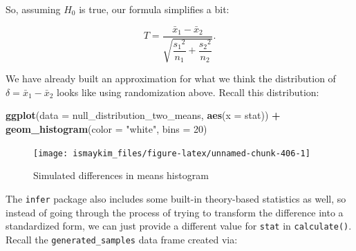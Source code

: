 \documentclass[12pt,]{krantz}
\makeatletter
\newenvironment{Shaded}{\begin{snugshade}}{\end{snugshade}}
\newcommand{\KeywordTok}[1]{\textcolor[rgb]{0.27,0.27,0.27}{\textbf{#1}}}
\newcommand{\DataTypeTok}[1]{\textcolor[rgb]{0.27,0.27,0.27}{#1}}
\newcommand{\DecValTok}[1]{\textcolor[rgb]{0.06,0.06,0.06}{#1}}
\newcommand{\StringTok}[1]{\textcolor[rgb]{0.5,0.5,0.5}{#1}}
\newcommand{\OperatorTok}[1]{\textcolor[rgb]{0.43,0.43,0.43}{\textbf{#1}}}
\newcommand{\NormalTok}[1]{#1}
\newenvironment{kframe}{%
\medskip{}
\setlength{\fboxsep}{.8em}
 \def\at@end@of@kframe{}%
 \ifinner\ifhmode%
  \def\at@end@of@kframe{\end{minipage}}%
  \begin{minipage}{\columnwidth}%
 \fi\fi%
 \def\FrameCommand##1{\hskip\@totalleftmargin \hskip-\fboxsep
 \colorbox{shadecolor}{##1}\hskip-\fboxsep
     \hskip-\linewidth \hskip-\@totalleftmargin \hskip\columnwidth}%
 \MakeFramed {\advance\hsize-\width
   \@totalleftmargin\z@ \linewidth\hsize
   \@setminipage}}%
 {\par\unskip\endMakeFramed%
 \at@end@of@kframe}
\renewenvironment{Shaded}{\begin{kframe}}{\end{kframe}}
\theoremstyle{definition}
\theoremstyle{definition}
\theoremstyle{definition}
\theoremstyle{remark}
\makeatother
\begin{document}
So, assuming \(H_0\) is true, our formula simplifies a bit:

\[T =\dfrac{ \bar{x}_1 - \bar{x}_2}{ \sqrt{\dfrac{{s_1}^2}{n_1} + \dfrac{{s_2}^2}{n_2}}  }.\]

We have already built an approximation for what we think the
distribution of \(\delta = \bar{x}_1 - \bar{x}_2\) looks like using
randomization above. Recall this distribution:

\begin{Shaded}
\begin{Highlighting}[]
\KeywordTok{ggplot}\NormalTok{(}\DataTypeTok{data =}\NormalTok{ null_distribution_two_means, }\KeywordTok{aes}\NormalTok{(}\DataTypeTok{x =}\NormalTok{ stat)) }\OperatorTok{+}
\StringTok{  }\KeywordTok{geom_histogram}\NormalTok{(}\DataTypeTok{color =} \StringTok{"white"}\NormalTok{, }\DataTypeTok{bins =} \DecValTok{20}\NormalTok{)}
\end{Highlighting}
\end{Shaded}

\begin{figure}

{\centering \texttt{[image: ismaykim\_files/figure-latex/unnamed-chunk-406-1]} 

}

\caption{Simulated differences in means histogram}\label{fig:unnamed-chunk-406}
\end{figure}

The \texttt{infer} package also includes some built-in theory-based
statistics as well, so instead of going through the process of trying to
transform the difference into a standardized form, we can just provide a
different value for \texttt{stat} in \texttt{calculate()}. Recall the
\texttt{generated\_samples} data frame created via:

\begin{Shaded}
\end{Shaded}
\end{document}
